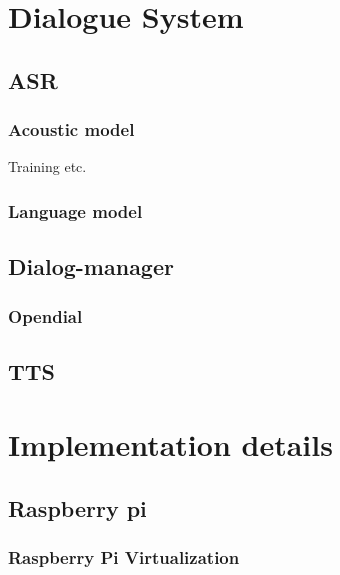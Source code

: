 \documentclass[a4paper, 12pt]{article}
\begin{document}


\pagestyle{empty}

\pagestyle{plain}
\setcounter{page}{1}


\section{Dialogue System}

\subsection{ASR}

\subsubsection{Acoustic model}
Training etc.

\subsubsection{Language model}

%

\subsection{Dialog-manager}

\subsubsection{Opendial}
\label{sec:opendial}


\subsection{TTS}

\section{Implementation details}
\subsection{Raspberry pi}
\subsubsection{Raspberry Pi Virtualization}

\end{document}

